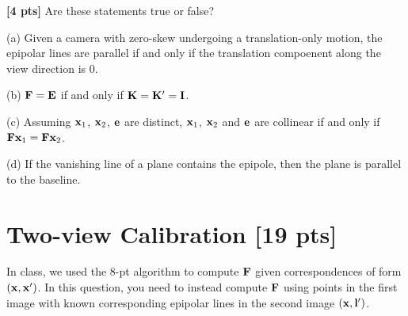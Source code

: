 \begin{questions}
    \begin{tcolorbox}[fit,height=4.5cm, width=\textwidth, blank, borderline={0.5pt}{-2pt},halign=left, valign=center, nobeforeafter]


    \end{tcolorbox}
    \question \textbf{[4 pts]} Are these statements true or false?

    (a) Given a camera with zero-skew undergoing a translation-only motion, the epipolar lines are parallel if and only if the translation compoenent along the view direction is $0$.

    \begin{tcolorbox}[fit,height=2cm, width=\textwidth, blank, borderline={0.5pt}{-2pt},halign=left, valign=center, nobeforeafter]
    \end{tcolorbox}

    (b) $\mathbf{F} = \mathbf{E}$ if and only if $\mathbf{K} = \mathbf{K}' = \mathbf{I}$.

    \begin{tcolorbox}[fit,height=2cm, width=\textwidth, blank, borderline={0.5pt}{-2pt},halign=left, valign=center, nobeforeafter]
    \end{tcolorbox}

    (c) Assuming $\mathbf{x}_1$, $\mathbf{x}_2$, $\mathbf{e}$ are distinct, $\mathbf{x}_1$, $\mathbf{x}_2$ and $\mathbf{e}$ are collinear if and only if $\mathbf{F}\mathbf{x}_1 = \mathbf{F}\mathbf{x}_2$.

    \begin{tcolorbox}[fit,height=2cm, width=\textwidth, blank, borderline={0.5pt}{-2pt},halign=left, valign=center, nobeforeafter]
    \end{tcolorbox}

    (d) If the vanishing line of a plane contains the epipole, then the plane is parallel to the baseline.

    \begin{tcolorbox}[fit,height=2cm, width=\textwidth, blank, borderline={0.5pt}{-2pt},halign=left, valign=center, nobeforeafter]
    \end{tcolorbox}

    \clearpage

    \section{Two-view Calibration [19 pts]}
    \question In class, we used the $8$-pt algorithm to compute $\mathbf{F}$ given correspondences of form $(\mathbf{x}, \mathbf{x}')$. In this question, you need to instead compute $\mathbf{F}$ using points in the first image with known corresponding epipolar lines in the second image $(\mathbf{x}, \mathbf{l}')$.


\end{questions}

